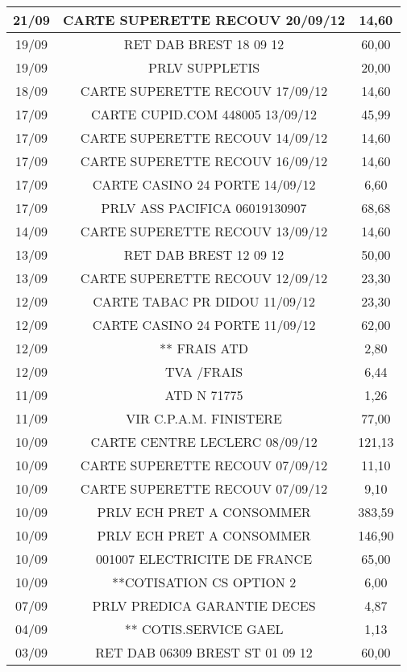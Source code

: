 \begin{tabular}{|c|c|c|}
\hline
21/09 & CARTE SUPERETTE RECOUV 20/09/12 & 14,60 \\
\hline
19/09 & RET DAB BREST          18 09 12 & 60,00 \\
\hline
19/09 & PRLV   SUPPLETIS & 20,00 \\
\hline
18/09 & CARTE SUPERETTE RECOUV 17/09/12 & 14,60 \\
\hline
17/09 & CARTE CUPID.COM 448005 13/09/12 & 45,99 \\
\hline
17/09 & CARTE SUPERETTE RECOUV 14/09/12 & 14,60 \\
\hline
17/09 & CARTE SUPERETTE RECOUV 16/09/12 & 14,60 \\
\hline
17/09 & CARTE CASINO 24 PORTE  14/09/12 & 6,60 \\
\hline
17/09 & PRLV   ASS PACIFICA  06019130907 & 68,68 \\
\hline
14/09 & CARTE SUPERETTE RECOUV 13/09/12 & 14,60 \\
\hline
13/09 & RET DAB BREST          12 09 12 & 50,00 \\
\hline
13/09 & CARTE SUPERETTE RECOUV 12/09/12 & 23,30 \\
\hline
12/09 & CARTE TABAC PR DIDOU   11/09/12 & 23,30 \\
\hline
12/09 & CARTE CASINO 24 PORTE  11/09/12 & 62,00 \\
\hline
12/09 & ** FRAIS ATD & 2,80 \\
\hline
12/09 & TVA /FRAIS & 6,44 \\
\hline
11/09 & ATD N 71775 & 1,26 \\
\hline
11/09 & VIR    C.P.A.M. FINISTERE & 77,00 \\
\hline
10/09 & CARTE CENTRE LECLERC   08/09/12 & 121,13 \\
\hline
10/09 & CARTE SUPERETTE RECOUV 07/09/12 & 11,10 \\
\hline
10/09 & CARTE SUPERETTE RECOUV 07/09/12 & 9,10 \\
\hline
10/09 & PRLV ECH PRET A CONSOMMER & 383,59 \\
\hline
10/09 & PRLV ECH PRET A CONSOMMER & 146,90 \\
\hline
10/09 & 001007 ELECTRICITE DE FRANCE & 65,00 \\
\hline
10/09 & **COTISATION CS OPTION 2 & 6,00 \\
\hline
07/09 & PRLV   PREDICA GARANTIE DECES & 4,87 \\
\hline
04/09 & ** COTIS.SERVICE GAEL & 1,13 \\
\hline
03/09 & RET DAB 06309 BREST ST 01 09 12 & 60,00 \\

\end{tabular}
